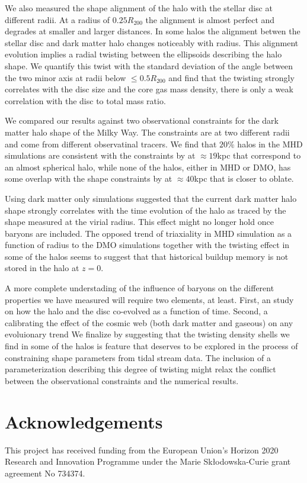 \documentclass[usenatbib]{mnras}
\begin{document}
We also measured the shape alignment of the halo with the stellar
disc at different radii.
At a radius of $0.25R_{200}$ the alignment is almost perfect and
degrades at smaller and larger distances.
In some halos the alignment betwen the stellar disc and dark matter
halo changes noticeably with radius. 
This alignment evolution implies a radial twisting between the ellipsoids
describing the halo shape. 
We quantify this twist with the standard deviation of the angle
between the two minor axis at radii below $\leq 0.5R_{200}$ and find
that the twisting strongly correlates with the disc size and the core
gas mass density, there is only a weak correlation with the disc to
total mass ratio.

We compared our results against two observational constraints for the
dark matter halo shape of the Milky Way. 
The constraints are at two different radii and come from different
observatinal tracers. 
We find that $20\%$ halos in the MHD simulations are consistent with
the constraints by \cite{Bovy16} at $\approx 19$kpc that correspond to
an almost spherical halo, while none of the halos, either in MHD or
DMO, has some overlap with the shape constraints by \cite{LM10} at
$\approx 40$kpc that is closer to oblate.  


Using dark matter only simulations \cite{VeraCiro11} suggested that
the current dark matter halo shape strongly correlates with the time
evolution of the halo as traced by the shape measured at the virial radius. 
This effect might no longer hold once baryons are included. 
The opposed trend of triaxiality in MHD simulation as a function of
radius to the DMO simulations together with the twisting effect in some of 
the halos seems to suggest that that historical buildup memory is not
stored in the halo at $z=0$.


A more complete understading of the influence of baryons on the
different properties we have measured will require two elements, at
least. First, an study on how the halo and the disc co-evolved as a
function of time. Second, a calibrating the effect of the cosmic web
(both dark matter and gaseous) on any evoluionary trend
\citep{2014MNRAS.443.1090F,2017MNRAS.469..594B,2019MNRAS.487.1607G} 
We finalize by suggesting that the twisting density shells we find in
some of the halos is feature that deserves to be explored in the
process of constraining shape parameters from tidal stream data.  The
inclusion of a parameterization describing this degree of twisting
might relax the conflict between the observational constraints and the
numerical results.  


\section*{Acknowledgements}
This project has received funding from the European Union's Horizon
2020 Research and Innovation Programme under the Marie
Sk\l{}odowska-Curie grant agreement No 734374. 

 
 
\end{document}

